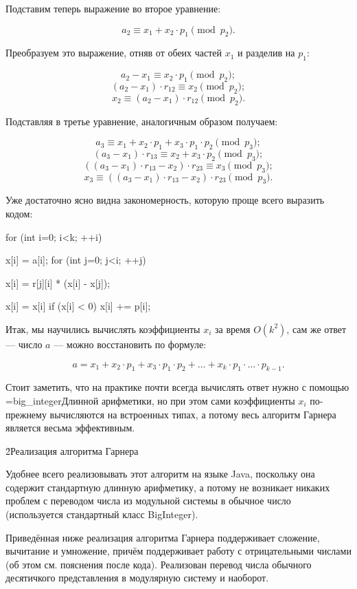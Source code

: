 Подставим теперь выражение во второе уравнение:

$$ a_2 \equiv x_1 + x_2 \cdot p_1 \pmod {p_2}. $$

Преобразуем это выражение, отняв от обеих частей $x_1$ и разделив на $p_1$:

$$ a_2 - x_1 \equiv x_2 \cdot p_1 \pmod {p_2}; $$
$$ (a_2 - x_1) \cdot r_{12} \equiv x_2 \pmod {p_2}; $$
$$ x_2 \equiv (a_2 - x_1) \cdot r_{12} \pmod {p_2}. $$

Подставляя в третье уравнение, аналогичным образом получаем:

$$ a_3 \equiv { x_1 + x_2 \cdot p_1 + x_3 \cdot p_1 \cdot p_2 \pmod {p_3} }; $$
$$ (a_3 - x_1) \cdot r_{13} \equiv x_2 + x_3 \cdot p_2 \pmod {p_3}; $$
$$ ((a_3 - x_1) \cdot r_{13} - x_2) \cdot r_{23} \equiv x_3 \pmod {p_3}; $$
$$ x_3 \equiv ((a_3 - x_1) \cdot r_{13} - x_2) \cdot r_{23} \pmod {p_3}. $$

Уже достаточно ясно видна закономерность, которую проще всего выразить кодом:

\code
for (int i=0; i<k; ++i) {
	x[i] = a[i];
	for (int j=0; j<i; ++j) {
		x[i] = r[j][i] * (x[i] - x[j]);

		x[i] = x[i] %
		if (x[i] < 0)  x[i] += p[i];
	}
}
\endcode

Итак, мы научились вычислять коэффициенты $x_i$ за время $O (k^2)$, сам же ответ --- число $a$ --- можно восстановить по формуле:

$$ a = x_1 + x_2 \cdot p_1 + x_3 \cdot p_1 \cdot p_2 + \ldots + x_k \cdot p_1 \cdot \ldots \cdot p_{k-1}. $$

Стоит заметить, что на практике почти всегда вычислять ответ нужно с помощью \algohref=big_integer{Длинной арифметики}, но при этом сами коэффициенты $x_i$ по-прежнему вычисляются на встроенных типах, а потому весь алгоритм Гарнера является весьма эффективным.


\h2{Реализация алгоритма Гарнера}

Удобнее всего реализовывать этот алгоритм на языке Java, поскольку она содержит стандартную длинную арифметику, а потому не возникает никаких проблем с переводом числа из модульной системы в обычное число (используется стандартный класс BigInteger).

Приведённая ниже реализация алгоритма Гарнера поддерживает сложение, вычитание и умножение, причём поддерживает работу с отрицательными числами (об этом см. пояснения после кода). Реализован перевод числа обычного десятичкого представления в модулярную систему и наоборот.

